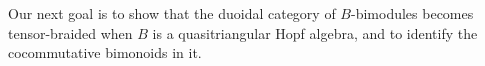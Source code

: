 \documentclass[nosumlimits,twoside]{amsart}
\theoremstyle{definition}
\theoremstyle{remark}
\begin{document}


\medskip

Our next goal is to show that the duoidal category of $B$-bimodules becomes tensor-braided when $B$ is a quasitriangular Hopf algebra, and to identify the cocommutative bimonoids in it.
\end{document}
